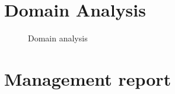 \documentclass[english,12pt,twoside,a4paper]{report}
\newcommand{\image}[4]{
  \begin{figure}[ht]
    \centering
    \fbox{\texttt{[image: \#1]}}
    \caption{#3}
    \label{fig:#4}
  \end{figure}
}
\begin{document}
\setlength{\columnsep}{1cm}
\tableofcontents
\clearpage

\part{Domain Analysis}
\image{model.png}{0.96}{Domain analysis}{domainAnalysis}

\part{Management report}
\end{document}
